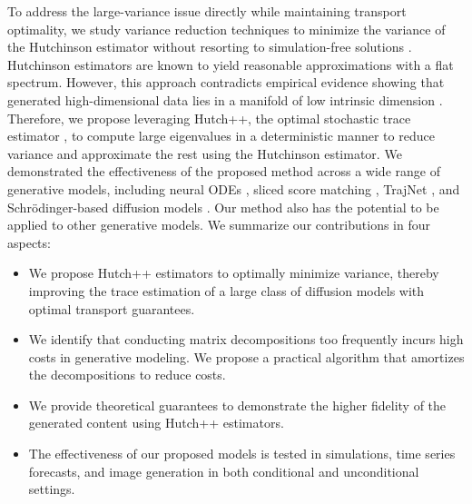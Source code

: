 To address the large-variance issue directly while maintaining transport optimality, we study variance reduction techniques to minimize the variance of the Hutchinson estimator without resorting to simulation-free solutions \citep{flow_matching, Albergo_stochastic_interpolants}. Hutchinson estimators are known to yield reasonable approximations with a flat spectrum. However, this approach contradicts empirical evidence showing that generated high-dimensional data lies in a manifold of low intrinsic dimension \citep{fefferman2016testing, diffusion_manifold, Manifolds_Hypothesis_image}. Therefore, we propose leveraging Hutch++, the optimal stochastic trace estimator \citep{hutch_pp}, to compute large eigenvalues in a deterministic manner to reduce variance and approximate the rest using the Hutchinson estimator. We demonstrated the effectiveness of the proposed method across a wide range of generative models, including neural ODEs \citep{neural_ode, FFJORD}, sliced score matching \citep{song2020sliced}, TrajNet \citep{TrajectoryNet}, and Schrödinger-based diffusion models \citep{forward_backward_SDE, mSB, SBP_max_llk, VSDM, VSMD}. Our method also has the potential to be applied to other generative models.
We summarize our contributions in four aspects:

\begin{itemize}
    \item We propose Hutch++ estimators to optimally minimize variance, thereby improving the trace estimation of a large class of diffusion models with optimal transport guarantees.
    \item We identify that conducting matrix decompositions too frequently incurs high costs in generative modeling. We propose a practical algorithm that amortizes the decompositions to reduce costs.
    \item We provide theoretical guarantees to demonstrate the higher fidelity of the generated content using Hutch++ estimators.  
    \item The effectiveness of our proposed models is tested in simulations, time series forecasts, and image generation in both conditional and unconditional settings.  
\end{itemize}


